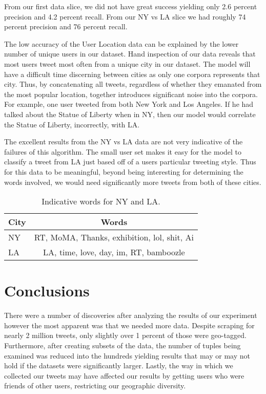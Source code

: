 \documentclass[12pt]{article}
\begin{document}
From our first data slice, we did not have great success yielding only 2.6 percent precision and 4.2 percent recall.  From our NY vs LA slice we had roughly 74 percent precision and 76 percent recall. 

The low accuracy of the User Location data can be explained by the lower number of unique users in our dataset. Hand inspection of our data reveals that most users tweet most often from a unique city in our dataset. The model will have a difficult time discerning between cities as only one corpora represents that city. Thus, by concatenating all tweets, regardless of whether they emanated from the most popular location, together introduces significant noise into the corpora. For example, one user tweeted from both New York and Los Angeles. If he had talked about the Statue of Liberty when in NY, then our model would correlate the Statue of Liberty, incorrectly, with LA.

The excellent results from the NY vs LA data are not very indicative of the failures of this algorithm. The small user set makes it easy for the model to classify a tweet from LA just based off of a users particular tweeting style. Thus for this data to be meaningful, beyond being interesting for determining the words involved, we would need significantly more tweets from both of these cities. 


\begin{table}
	\begin{center}
		\begin{tabular}{| l || c |}
			\hline
			City & Words \\ \hline
			NY & RT, MoMA, Thanks, exhibition, lol, shit, Ai \\ \hline
			LA & LA, time, love, day, im, RT, bamboozle \\ 
			\hline
		\end{tabular}
	\end{center}
	\caption{Indicative words for NY and LA.}
	\label{table:poploc}
\end{table}

\section*{Conclusions}
There were a number of discoveries after analyzing the results of our experiment however the most apparent was that we needed more data.  Despite scraping for nearly 2 million tweets, only slightly over 1 percent of those were geo-tagged.  Furthermore, after creating subsets of the data, the number of tuples being examined was reduced into the hundreds yielding results that may or may not hold if the datasets were significantly larger.  Lastly, the way in which we collected our tweets may have affected our results by getting users who were friends of other users, restricting our geographic diversity.  
\end{document}
